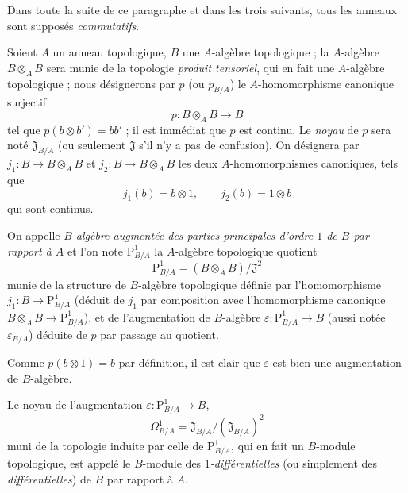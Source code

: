Dans toute la suite de ce paragraphe et dans les trois suivants, tous les
anneaux sont supposés \emph{commutatifs}.

\begin{env}[20.4.1]
\label{0.20.4.1-fr}
Soient $A$ un anneau topologique, $B$ une $A$-algèbre topologique ; la
$A$-algèbre $B\otimes_A B$ sera munie de la topologie \emph{produit
tensoriel}, qui en fait une $A$-algèbre topologique ; nous désignerons par $p$
(ou $p_{B/A}$) le $A$-homomorphisme canonique surjectif
\begin{equation}
\tag{20.4.1.1}
\label{0.20.4.1.1-fr}
  p:B\otimes_A B\to B
\end{equation}
tel que $p(b\otimes b')=bb'$ ; il est immédiat que $p$ est continu. Le
\emph{noyau} de $p$ sera noté $\mathfrak{J}_{B/A}$ (ou seulement
$\mathfrak{J}$ s'il n'y a pas de confusion). On désignera par
$j_1:B\to B\otimes_A B$ et $j_2:B\to B\otimes_A B$ les deux
$A$-homomorphismes canoniques, tels que
\[
  j_1(b)=b\otimes1, \qquad j_2(b)=1\otimes b
\]
qui sont continus.
\end{env}

\begin{definition}[20.4.2]
\label{0.20.4.2-fr}
On appelle \emph{$B$-algèbre augmentée des parties principales d'ordre $1$ de
$B$ par rapport à $A$} et l'on note $\mathrm{P}^1_{B/A}$ la $A$-algèbre
topologique quotient
\begin{equation}
\tag{20.4.2.1}
\label{0.20.4.2.1-fr}
  \mathrm{P}^1_{B/A}=(B\otimes_A B)/\mathfrak{J}^2
\end{equation}
munie de la structure de $B$-algèbre topologique définie par l'homomorphisme
$\bar{j}_1:B\to\mathrm{P}^1_{B/A}$ (déduit de $j_1$ par composition avec
l'homomorphisme canonique $B\otimes_A B\to\mathrm{P}^1_{B/A}$), et de
l'augmentation de $B$-algèbre $\varepsilon:\mathrm{P}^1_{B/A}\to B$ (aussi
notée $\varepsilon_{B/A}$) déduite de $p$ par passage au quotient.

Comme $p(b\otimes1)=b$ par définition, il est clair que $\varepsilon$ est
bien une augmentation de $B$-algèbre.
\end{definition}

\begin{definition}[20.4.3]
\label{0.20.4.3-fr}
Le noyau de l'augmentation $\varepsilon:\mathrm{P}^1_{B/A}\to B$,
\begin{equation}
\tag{20.4.3.1}
\label{0.20.4.3.1-fr}
  \Omega^1_{B/A}=\mathfrak{J}_{B/A}/(\mathfrak{J}_{B/A})^2
\end{equation}
muni de la topologie induite par celle de $\mathrm{P}^1_{B/A}$, qui en fait
un $B$-module topologique, est appelé le $B$-module des
\emph{$1$-différentielles} (ou simplement des \emph{différentielles}) de $B$
par rapport à $A$.
\end{definition}

